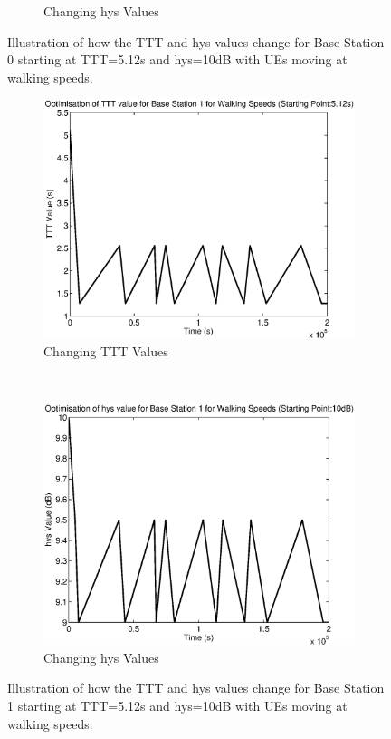 \begin{figure}[H]
\begin{subfigure}[b]{0.49\textwidth}
                \caption{Changing hys Values}
        \end{subfigure}
        \caption{Illustration of how the TTT and hys values change for Base Station 0 starting at TTT=5.12s and hys=10dB with UEs moving at walking speeds.}
\end{figure}
\begin{figure}[H]
        \centering
        \begin{subfigure}[b]{0.49\textwidth}
                \includegraphics[width=\textwidth]{figures/graphs/walkhigh/TTT1.eps}
                \caption{Changing TTT Values}
        \end{subfigure}%
        ~ %
        \begin{subfigure}[b]{0.49\textwidth}
                \includegraphics[width=\textwidth]{figures/graphs/walkhigh/hys1.eps}
                \caption{Changing hys Values}
        \end{subfigure}
        \caption{Illustration of how the TTT and hys values change for Base Station 1 starting at TTT=5.12s and hys=10dB with UEs moving at walking speeds.}
\end{figure}

